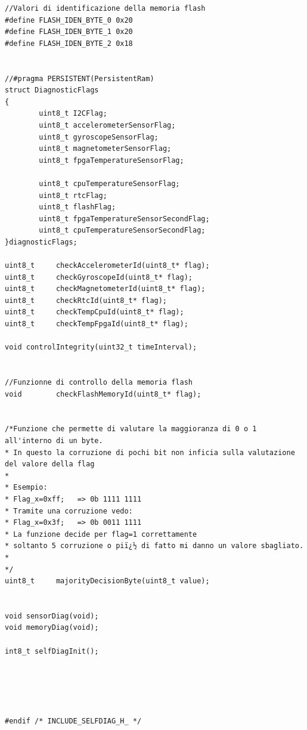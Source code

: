 \documentclass[LaM,binding=0.6cm,oneside]{../sapthesis}
\begin{document}
\begin{lstlisting}
//Valori di identificazione della memoria flash
#define FLASH_IDEN_BYTE_0 0x20
#define FLASH_IDEN_BYTE_1 0x20
#define FLASH_IDEN_BYTE_2 0x18


//#pragma PERSISTENT(PersistentRam)
struct DiagnosticFlags
{
        uint8_t I2CFlag;                           
        uint8_t accelerometerSensorFlag;
        uint8_t gyroscopeSensorFlag;
        uint8_t magnetometerSensorFlag;
        uint8_t fpgaTemperatureSensorFlag;

        uint8_t cpuTemperatureSensorFlag;
        uint8_t rtcFlag;
        uint8_t flashFlag;
        uint8_t fpgaTemperatureSensorSecondFlag;
        uint8_t cpuTemperatureSensorSecondFlag;		
}diagnosticFlags;

uint8_t     checkAccelerometerId(uint8_t* flag);
uint8_t     checkGyroscopeId(uint8_t* flag);
uint8_t     checkMagnetometerId(uint8_t* flag);
uint8_t     checkRtcId(uint8_t* flag);
uint8_t     checkTempCpuId(uint8_t* flag);
uint8_t     checkTempFpgaId(uint8_t* flag);

void controlIntegrity(uint32_t timeInterval);


//Funzionne di controllo della memoria flash
void        checkFlashMemoryId(uint8_t* flag);


/*Funzione che permette di valutare la maggioranza di 0 o 1 all'interno di un byte.
* In questo la corruzione di pochi bit non inficia sulla valutazione del valore della flag
*
* Esempio:
* Flag_x=0xff;   => 0b 1111 1111
* Tramite una corruzione vedo:
* Flag_x=0x3f;   => 0b 0011 1111
* La funzione decide per flag=1 correttamente
* soltanto 5 corruzione o piï¿½ di fatto mi danno un valore sbagliato.
*
*/
uint8_t     majorityDecisionByte(uint8_t value);


void sensorDiag(void);
void memoryDiag(void);

int8_t selfDiagInit();





#endif /* INCLUDE_SELFDIAG_H_ */
\end{lstlisting}
\end{document}
